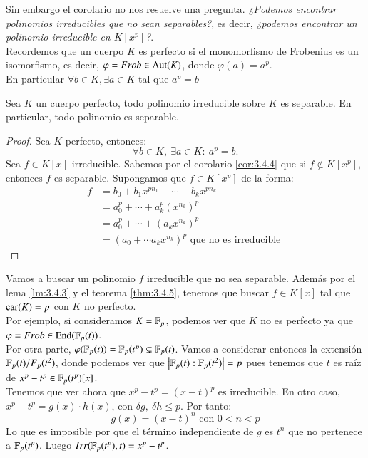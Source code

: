 Sin embargo el corolario no nos resuelve una pregunta. \textit{¿Podemos encontrar polinomios irreducibles que no sean separables?}, es decir, \textit{ ¿podemos encontrar un polinomio irreducible en $K[x^p]$?}.\\

Recordemos que un cuerpo $K$ es perfecto si el monomorfismo de Frobenius es un isomorfismo, es decir, $\varphi = Frob \in \mathrm{Aut}(K)$, donde $\varphi(a) = a^p$.\\
En particular $\forall b \in K, \exists a \in K$ tal que $a^p = b$

\begin{thm}\label{thm:3.4.5}
    Sea $K$ un cuerpo perfecto, todo polinomio irreducible sobre $K$ es separable. En particular, todo polinomio es separable.
\end{thm}
\begin{proof}
    Sea $K$ perfecto, entonces:
    $$
        \forall b \in K,\ \exists a \in K:\ a^p = b.
    $$
    Sea $f\in K[x]$ irreducible. Sabemos por el corolario \ref{cor:3.4.4} que si $f \notin K[x^p]$, entonces $f$ es separable. Supongamos que $f \in K[x^p]$ de la forma:
    \begin{align*}
        f &= b_0 + b_1 x^{pn_1} + \cdots + b_k x^{pn_k}\\
          &= a_0^p + \cdots + a_k^p (x^{n_k})^p\\
          &= a_0^p + \cdots + (a_k x^{n_k})^p\\
          &= (a_0 + \cdots a_k x^{n_k})^p \text{ que no es irreducible }
    \end{align*}
\end{proof}

\begin{eg}
    Vamos a buscar un polinomio $f$ irreducible que no sea separable. Además por el lema \ref{lm:3.4.3} y el teorema \ref{thm:3.4.5}, tenemos que buscar $f \in K[x]$ tal que $\mathrm{car}(K) = p$ con $K$ no perfecto.\\
    Por ejemplo, si consideramos $K = \mathbb{F}_p$, podemos ver que $K$ no es perfecto ya que $\varphi = Frob \in \mathrm{End}(\mathbb{F}_p(t))$.\\
    Por otra parte, $\varphi(\mathbb{F}_p(t)) = \mathbb{F}_p(t^p) \subsetneq \mathbb{F}_p(t)$. Vamos a considerar entonces la extensión $\mathbb{F}_p(t)/F_p(t^2)$, donde podemos ver que $\left|\mathbb{F}_p(t) : \mathbb{F}_p(t^2)\right| = p$ pues tenemos que $t$ es raíz de $x^p - t^p \in \mathbb{F}_p(t^p)[x]$.\\

    Tenemos que ver ahora que $x^p - t^p = (x - t)^p$ es irreducible. En otro caso, $x^p - t^p = g(x) \cdot h(x)$, con $\delta g,\ \delta h \leq p$. Por tanto:
    $$
        g(x) = (x - t)^n \text{ con } 0 < n < p
    $$
    Lo que es imposible por que el término independiente de $g$ es $t^n$ que no pertenece a $\mathbb{F}_p(t^p)$. Luego $Irr(\mathbb{F}_p(t^p), t) = x^p - t^p$.
\end{eg}

